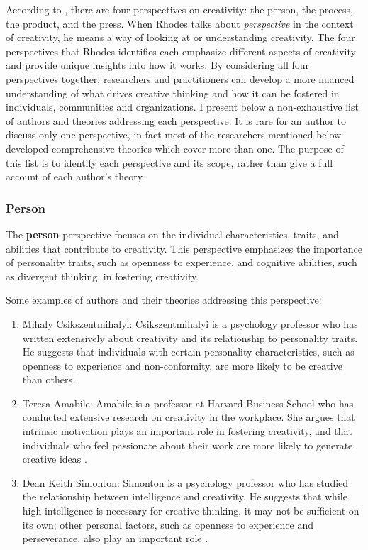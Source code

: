 According to \cite{Rhodes1961}, there are four perspectives on creativity: the person, the process, the product, and the press. When Rhodes talks about \emph{perspective} in the context of creativity, he means a way of looking at or understanding creativity. The four perspectives that Rhodes identifies each emphasize different aspects of creativity and provide unique insights into how it works. By considering all four perspectives together, researchers and practitioners can develop a more nuanced understanding of what drives creative thinking and how it can be fostered in individuals, communities and organizations. I present below a non-exhaustive list of authors and theories addressing each perspective. It is rare for an author to discuss only one perspective, in fact most of the researchers mentioned below developed comprehensive theories which cover more than one. The purpose of this list is to identify each perspective and its scope, rather than give a full account of each author's theory. 

\subsubsection{Person}
The \textbf{person} perspective focuses on the individual characteristics, traits, and abilities that contribute to creativity. This perspective emphasizes the importance of personality traits, such as openness to experience, and cognitive abilities, such as divergent thinking, in fostering creativity.

Some examples of authors and their theories addressing this perspective:

\begin{enumerate}
\item Mihaly Csikszentmihalyi: Csikszentmihalyi is a psychology professor who has written extensively about creativity and its relationship to personality traits. He suggests that individuals with certain personality characteristics, such as openness to experience and non-conformity, are more likely to be creative than others \citep{Csikszentmihalyi1990,Csikszentmihalyi1996}.

\item Teresa Amabile: Amabile is a professor at Harvard Business School who has conducted extensive research on creativity in the workplace. She argues that intrinsic motivation plays an important role in fostering creativity, and that individuals who feel passionate about their work are more likely to generate creative ideas \citep{Amabile1997}.

\item Dean Keith Simonton: Simonton is a psychology professor who has studied the relationship between intelligence and creativity. He suggests that while high intelligence is necessary for creative thinking, it may not be sufficient on its own; other personal factors, such as openness to experience and perseverance, also play an important role \citep{Simonton1985,Simonton1994,Simonton1999}.
\end{enumerate}

